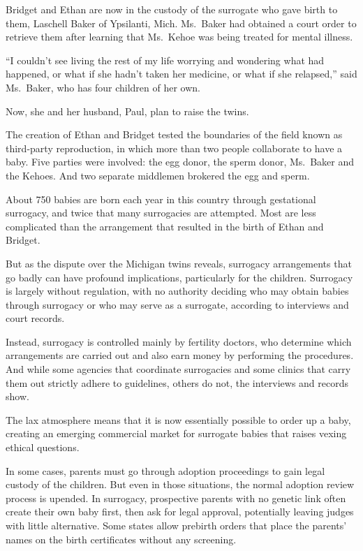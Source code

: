 ﻿\documentclass[12pt]{article}
\begin{document}
Bridget and Ethan are now in the custody of the surrogate who gave birth to them, Laschell Baker of
Ypsilanti, Mich. Ms.~Baker had obtained a court order to retrieve them after learning that Ms.~Kehoe
was being treated for mental illness.

``I couldn't see living the rest of my life worrying and wondering what had happened, or what if she
hadn't taken her medicine, or what if she relapsed,'' said Ms.~Baker, who has four children of her
own.

Now, she and her husband, Paul, plan to raise the twins.

The creation of Ethan and Bridget tested the boundaries of the field known as third-party
reproduction, in which more than two people collaborate to have a baby. Five parties were involved:
the egg donor, the sperm donor, Ms.~Baker and the Kehoes. And two separate middlemen brokered the
egg and sperm.

About 750 babies are born each year in this country through gestational surrogacy, and twice that
many surrogacies are attempted. Most are less complicated than the arrangement that resulted in the
birth of Ethan and Bridget.

But as the dispute over the Michigan twins reveals, surrogacy arrangements that go badly can have
profound implications, particularly for the children. Surrogacy is largely without regulation, with
no authority deciding who may obtain babies through surrogacy or who may serve as a surrogate,
according to interviews and court records.

Instead, surrogacy is controlled mainly by fertility doctors, who determine which arrangements are
carried out and also earn money by performing the procedures. And while some agencies that
coordinate surrogacies and some clinics that carry them out strictly adhere to guidelines, others do
not, the interviews and records show.

The lax atmosphere means that it is now essentially possible to order up a baby, creating an
emerging commercial market for surrogate babies that raises vexing ethical questions.

In some cases, parents must go through adoption proceedings to gain legal custody of the children.
But even in those situations, the normal adoption review process is upended. In surrogacy,
prospective parents with no genetic link often create their own baby first, then ask for legal
approval, potentially leaving judges with little alternative. Some states allow prebirth orders that
place the parents' names on the birth certificates without any screening.
\end{document}
